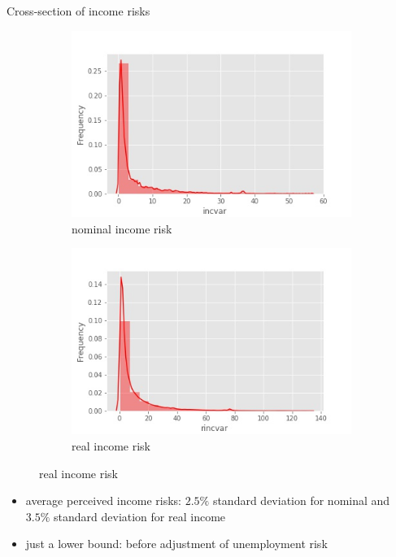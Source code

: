 \documentclass{beamer}
\begin{document}
\begin{frame}{Cross-section of income risks}
	\begin{figure}
		\centering
		\label{incvar_hist}
			\begin{subfigure}[b]{0.45\textwidth}
			\centering
			\caption{nominal income risk}
		\includegraphics[width=\textwidth]{figures/hist_incvar}
		\end{subfigure}
		\begin{subfigure}[b]{0.45\textwidth}
		\centering
		\caption{real income risk}
		\includegraphics[width=\textwidth]{figures/hist_rincvar}
	\end{subfigure}
	\end{figure}
	\begin{itemize}
		\item average perceived income risks:  $2.5\%$ standard deviation for nominal and $3.5\%$ standard deviation for real income
		\item just a lower bound: before adjustment of unemployment risk 
	\end{itemize}
\end{frame}
\end{document}
